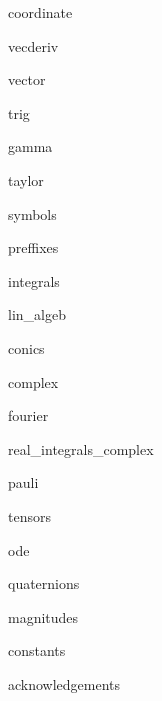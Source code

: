 \documentclass[8pt,a4paper,fleqn]{extarticle} %
\begin{document}
\begin{multicols}{3}
\raggedright %
\scriptsize{} 

{coordinate}

{vecderiv}

{vector}

{trig}

{gamma}

{taylor}

{symbols}

{preffixes}

{integrals}

{lin_algeb}

{conics}

{complex}

{fourier}

{real_integrals_complex}

{pauli}

{tensors}

{ode}

{quaternions}

{magnitudes}

{constants}

{acknowledgements}

\end{multicols}
\end{document}
